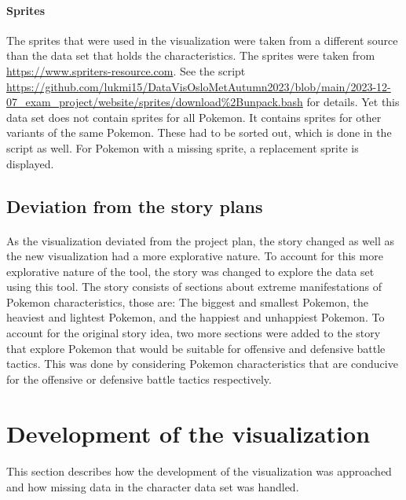 \documentclass[12pt, a4paper]{article}
\begin{document}
			\paragraph{Sprites}
				The sprites that were used in the visualization were taken from a different source than the data set that holds the characteristics. The sprites were taken from \href{https://www.spriters-resource.com}{https://www.spriters-resource.com}. See the script \href{https://github.com/lukmi15/DataVisOsloMetAutumn2023/blob/main/2023-12-07\_exam\_project/website/sprites/download\%2Bunpack.bash}{https://github.com/lukmi15/DataVisOsloMetAutumn2023/blob/main/2023-12-07\_exam\_project/website/sprites/download\%2Bunpack.bash} for details. Yet this data set does not contain sprites for all Pokemon. It contains sprites for other variants of the same Pokemon. These had to be sorted out, which is done in the script as well. For Pokemon with a missing sprite, a replacement sprite is displayed.
		\subsection{Deviation from the story plans}
			\paragraph{}
				As the visualization deviated from the project plan, the story changed as well as the new visualization had a more explorative nature. To account for this more explorative nature of the tool, the story was changed to explore the data set using this tool. The story consists of sections about extreme manifestations of Pokemon characteristics, those are: The biggest and smallest Pokemon, the heaviest and lightest Pokemon, and the happiest and unhappiest Pokemon. To account for the original story idea, two more sections were added to the story that explore Pokemon that would be suitable for offensive and defensive battle tactics. This was done by considering Pokemon characteristics that are conducive for the offensive or defensive battle tactics respectively.
	\section{Development of the visualization}
		\paragraph{}
		This section describes how the development of the visualization was approached and how missing data in the character data set was handled.
\end{document}
